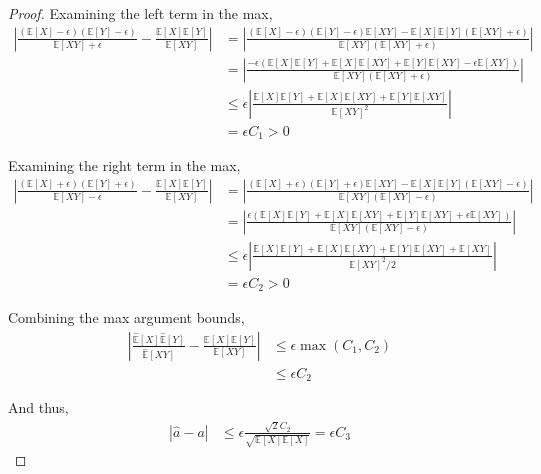 \begin{proof}
Examining the left term in the max,
\begin{align}
    \left| \frac{(\mathbb{E}[X] - \epsilon)(\mathbb{E}[Y] - \epsilon)}{\mathbb{E}[XY] + \epsilon}  - \frac{\mathbb{E}[X] \mathbb{E}[Y]}{\mathbb{E}[XY]} \right| &= \left| \frac{(\mathbb{E}[X] - \epsilon)(\mathbb{E}[Y] - \epsilon)\mathbb{E}[XY] - \mathbb{E}[X] \mathbb{E}[Y] (\mathbb{E}[XY] + \epsilon)}{\mathbb{E}[XY](\mathbb{E}[XY] + \epsilon)} \right| \\
    &= \left|\frac{ -\epsilon (\mathbb{E}[X] \mathbb{E}[Y] + \mathbb{E}[X] \mathbb{E}[XY] + \mathbb{E}[Y] \mathbb{E}[XY] - \epsilon \mathbb{E}[XY])}{\mathbb{E}[XY](\mathbb{E}[XY] + \epsilon)} \right| \\
    &\leq \epsilon \left| \frac{ \mathbb{E}[X] \mathbb{E}[Y] + \mathbb{E}[X] \mathbb{E}[XY] + \mathbb{E}[Y] \mathbb{E}[XY]}{\mathbb{E}[XY]^2} \right| \\
    &= \epsilon C_1 > 0
\end{align}

Examining the right term in the max,
\begin{align}
    \left| \frac{(\mathbb{E}[X] + \epsilon)(\mathbb{E}[Y] + \epsilon)}{\mathbb{E}[XY] - \epsilon}  - \frac{\mathbb{E}[X] \mathbb{E}[Y]}{\mathbb{E}[XY]} \right| &= \left| \frac{(\mathbb{E}[X] + \epsilon)(\mathbb{E}[Y] + \epsilon)\mathbb{E}[XY] - \mathbb{E}[X] \mathbb{E}[Y] (\mathbb{E}[XY] - \epsilon)}{\mathbb{E}[XY](\mathbb{E}[XY] - \epsilon)} \right| \\
    &= \left|\frac{ \epsilon (\mathbb{E}[X] \mathbb{E}[Y] + \mathbb{E}[X] \mathbb{E}[XY] + \mathbb{E}[Y] \mathbb{E}[XY] + \epsilon \mathbb{E}[XY])}{\mathbb{E}[XY](\mathbb{E}[XY] - \epsilon)} \right| \\
    &\leq \epsilon \left| \frac{ \mathbb{E}[X] \mathbb{E}[Y] + \mathbb{E}[X] \mathbb{E}[XY] + \mathbb{E}[Y] \mathbb{E}[XY] + \mathbb{E}[XY]}{\mathbb{E}[XY]^2/2} \right| \\
    &= \epsilon C_2 > 0
\end{align}

Combining the max argument bounds,
\begin{align}
    \left| \frac{\hat{\mathbb{E}}[X] \hat{\mathbb{E}}[Y]}{\hat{\mathbb{E}}[XY]} - \frac{\mathbb{E}[X] \mathbb{E}[Y]}{\mathbb{E}[XY]} \right| &\leq \epsilon \max(C_1, C_2) \\
    &\leq \epsilon C_2
\end{align}

And thus,
\begin{align}
    | \hat{a} -  a | &\leq \epsilon \frac{\sqrt{2}C_2}{\sqrt{\mathbb{E}[X] \mathbb{E}[X]}} = \epsilon C_3
\end{align}


\end{proof}
